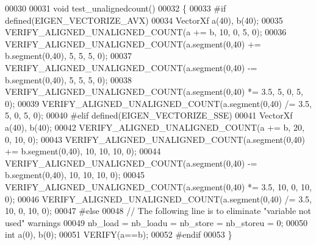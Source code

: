 \begin{DoxyCode}
00030 
00031 \textcolor{keywordtype}{void} test\_unalignedcount()
00032 \{
00033 \textcolor{preprocessor}{  #if defined(EIGEN\_VECTORIZE\_AVX)}
00034   VectorXf a(40), b(40);
00035   VERIFY\_ALIGNED\_UNALIGNED\_COUNT(a += b, 10, 0, 5, 0);
00036   VERIFY\_ALIGNED\_UNALIGNED\_COUNT(a.segment(0,40) += b.segment(0,40), 5, 5, 5, 0);
00037   VERIFY\_ALIGNED\_UNALIGNED\_COUNT(a.segment(0,40) -= b.segment(0,40), 5, 5, 5, 0);
00038   VERIFY\_ALIGNED\_UNALIGNED\_COUNT(a.segment(0,40) *= 3.5, 5, 0, 5, 0);
00039   VERIFY\_ALIGNED\_UNALIGNED\_COUNT(a.segment(0,40) /= 3.5, 5, 0, 5, 0);
00040 \textcolor{preprocessor}{  #elif defined(EIGEN\_VECTORIZE\_SSE)}
00041   VectorXf a(40), b(40);
00042   VERIFY\_ALIGNED\_UNALIGNED\_COUNT(a += b, 20, 0, 10, 0);
00043   VERIFY\_ALIGNED\_UNALIGNED\_COUNT(a.segment(0,40) += b.segment(0,40), 10, 10, 10, 0);
00044   VERIFY\_ALIGNED\_UNALIGNED\_COUNT(a.segment(0,40) -= b.segment(0,40), 10, 10, 10, 0);
00045   VERIFY\_ALIGNED\_UNALIGNED\_COUNT(a.segment(0,40) *= 3.5, 10, 0, 10, 0);
00046   VERIFY\_ALIGNED\_UNALIGNED\_COUNT(a.segment(0,40) /= 3.5, 10, 0, 10, 0);
00047 \textcolor{preprocessor}{  #else}
00048   \textcolor{comment}{// The following line is to eliminate "variable not used" warnings}
00049   nb\_load = nb\_loadu = nb\_store = nb\_storeu = 0;
00050   \textcolor{keywordtype}{int} a(0), b(0);
00051   VERIFY(a==b);
00052 \textcolor{preprocessor}{  #endif}
00053 \}
\end{DoxyCode}
